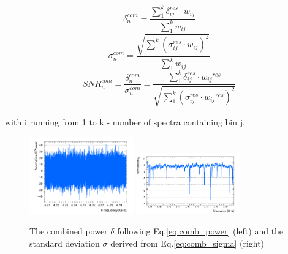 \begin{equation}
    \label{eq:comb_power}
    \delta_{n}^{com} = \frac{ \sum_{1}^{k}\delta_{ij}^{res} \cdot {w_{ij}}}{\sum_{1}^{k} {w_{ij}}}
\end{equation}
\begin{equation}
    \label{eq:comb_sigma}
    \sigma_{n}^{com} = \frac{ \sqrt{\sum_{1}^{k}(\sigma_{ij}^{res} \cdot {w_{ij}})^2}}{\sum_{1}^{k} {w_{ij}}}
\end{equation}
\begin{equation}
    \label{eq:comb_snr}
    {SNR}_{n}^{com} = \frac{\delta^{com}_{n}}{\sigma^{com}_{n}}= \frac{\sum_{1}^{k}\delta_{ij}^{res} \cdot {w_{ij}}^{res}}{ \sqrt{\sum_{1}^{k}(\sigma_{ij}^{res} \cdot {w_{ij}}^{res})^2}}
\end{equation}

with i running from 1 to k - number of spectra containing bin j.

\begin{figure}[h]
    \centering
    \includegraphics[width=0.4\textwidth,height = 0.3\textwidth]{figures/Power_CombSpectrum_AxionRun_AllSteps_Rescan_SG4_W201_LqWeight.png}
    \includegraphics[width=0.4\textwidth,height = 0.3\textwidth]{figures/Sigma_CombSpectrum_AxionRun_AllSteps_Rescan_SG4_W201_LqWeight.png}
    \caption{The combined power $\delta$ following Eq.\eqref{eq:comb_power} (left) and the standard deviation $\sigma$ derived from Eq.\eqref{eq:comb_sigma} (right)}
    \label{fig:power_sigma_comb}
\end{figure}

